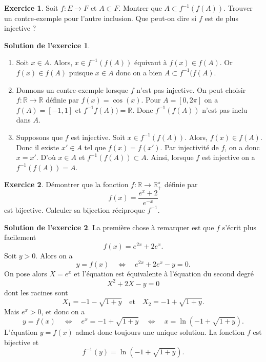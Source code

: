 \documentclass[a4paper, 11pt,openany]{article}%
\theoremstyle{plain}
\theoremstyle{definition}
\newtheorem{exo}{Exercice}
\newtheorem{sol}{Solution de l'exercice}
\theoremstyle{remark}
\newcommand{\R}{\mathbb{R}}
\begin{document}
\begin{exo}
Soit $f :E \to F$ et $A \subset F$. Montrer que $ A \subset f^{-1}(f(A))$. Trouver un contre-exemple pour l'autre inclusion. Que peut-on dire si $f$ est de plus injective ?
\end{exo}

\begin{sol}
\begin{enumerate}
 \item Soit $x\in A$. Alors, $x\in f^{-1}(f(A))$ équivaut à $f(x)\in f(A)$. Or $f(x)\in f(A)$ puisque $x\in A$ donc on a bien $A \subset f^{-1}(f(A)$. 
  \item Donnons un contre-exemple lorsque $f$ n'est pas injective. On peut choisir $f\colon \mathbb R \to \mathbb R$ définie par $f(x)=\cos(x)$. Pour $A=[0,2\pi]$ on a $f(A)=[-1,1]$ et $f^{-1}f(A))=\mathbb R$. Donc $f^{-1}(f(A))$ n'est pas inclu dans $A$.
 \item Supposons que $f$ est injective. Soit $x\in f^{-1}(f(A))$. Alors, $f(x)\in f(A)$. Donc il existe $x' \in A$ tel que $f(x)=f(x')$. Par injectivité de $f$, on a donc $x=x'$. D'où $x\in A$ et $f^{-1}(f(A)) \subset A$. Ainsi, lorsque $f$ est injective on a  $f^{-1}(f(A)) = A$.
\end{enumerate}
\end{sol}
   

\begin{exo}
Démontrer que la fonction $f: \R \to \R_+^{\star}$ définie par 
\[ f(x)=\frac{e^x+2}{e^{-x}}\]
est bijective. Calculer sa bijection réciproque $f^{-1}$.
\end{exo}

\begin{sol}
La première chose à remarquer est que $f$ s'écrit plus facilement 
\[ f(x)=e^{2x}+2e^x.\]
Soit $y >0$. Alors on a 
\[ y=f(x) \quad \Leftrightarrow \quad e^{2x}+2e^{x}-y=0.\]
On pose alors $X=e^x$ et l'équation est équivalente à l'équation du second degré \[ X^2+2X-y=0\]
dont les racines sont 
\[ X_1=-1- \sqrt{1+y} \quad \text{et} \quad X_2=-1+\sqrt{1+y}.\]
Mais $e^x>0$, et donc on a \[ y=f(x) \quad \Leftrightarrow \quad e^x=-1+\sqrt{1+y} \quad \Leftrightarrow \quad x=\ln(-1+\sqrt{1+y}).\] L'équation $y=f(x)$ admet donc toujours une unique solution. La fonction $f$ est bijective et 
\[ f^{-1}(y)=\ln(-1+\sqrt{1+y}).\]
\end{sol}
\end{document}
